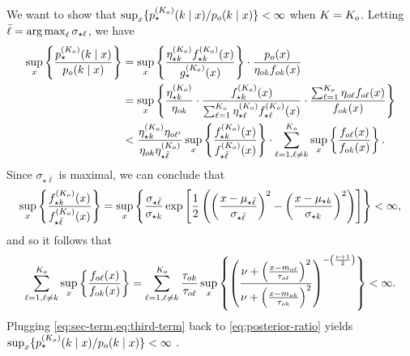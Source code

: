    We want to show that $\sup_x\{ p_{\star}^{(K_{o})}(k \mid x)/p_{o}(k \mid x) \}< \infty$ when $K = K_{o}$.
    Letting $\bar{\ell} = \argmax_\ell \sigma_{\star \ell}$, we have
	\begin{align}
		\sup_{x}\left\{\frac{p_{\star}^{(\numcomps_{o})}(k \mid x)}{p_{o}(k \mid x)}\right\}
		 & = \sup_{x}\left\{\frac{\eta^{(\numcomps_o)}_{\star k}f^{(\numcomps_o)}_{\star k}(x)}{g^{(\numcomps_o)}_{\star}(x)}\right\}\cdot \frac{p_{o}(x)}{\eta_{ok}f_{ok}(x)}    \\
		 & = \sup_{x}\left\{\frac{\eta^{(\numcomps_o)}_{\star k}}{\eta_{ok}} \cdot  \frac{f^{(\numcomps_o)}_{\star k}(x)}{\sum_{\ell=1}^{\numcomps_{o}}\eta^{(\numcomps_o)}_{\star \ell}f^{(\numcomps_o)}_{\star \ell}(x)} \cdot \frac{\sum_{\ell=1}^{\numcomps_{o}}\eta_{o\ell}f_{o\ell}(x)}{f_{ok}(x)}\right\} \\
         & < \frac{\eta^{(\numcomps_o)}_{\star k}\eta_{o\ell'}}{\eta_{ok}\eta^{(\numcomps_o)}_{\star \bar{\ell}}} \sup_{x} \left\{  \frac{f^{(\numcomps_o)}_{\star k}(x)}{f^{(\numcomps_o)}_{\star \bar{\ell}}(x)}\right\} \cdot  \sum_{\ell=1, \ell\ne k}^{\numcomps_o}\sup_{x}\left\{\frac{f_{o\ell}(x)}{f_{ok}(x)}\right\}. \label{eq:posterior-ratio}
	\end{align}
    Since $\sigma_{\star \bar{\ell}}$ is maximal, we can conclude that 
\begin{align}
\sup_{x} \left\{  \frac{f^{(\numcomps_o)}_{\star k}(x)}{f^{(\numcomps_o)}_{\star \bar{\ell}}(x)}\right\} = \sup_{x} \left\{ \frac{\sigma_{\star \bar{\ell}
}}{\sigma_{\star k}}\exp\left[\frac{1}{2} \left(\left(\frac{x-\mu_{\star \bar{\ell}}}{\sigma_{\star \bar{\ell}}}\right)^2 -\left(\frac{x-\mu_{\star k}}{\sigma_{\star k}}\right)^2 \right)\right] \right\} < \infty, \label{eq:sec-term}
\end{align}
and so it follows that 
\begin{align}
    \sum_{\ell=1, \ell\ne k}^{\numcomps_o}\sup_{x}\left\{\frac{f_{o\ell}(x)}{f_{ok}(x)}\right\} =  \sum_{\ell=1, \ell\ne k}^{\numcomps_o}\frac{\tau_{ok}}{\tau_{o\ell}} \sup_x \left\{ \left(\frac{\nu+\left(\frac{x-m_{o\ell}}{\tau_{o\ell}}\right)^2}{\nu+\left(\frac{x-m_{ok}}{\tau_{ok}}\right)^2}\right)^{-\left(\frac{\nu+1}{2}\right)} \right\} < \infty. \label{eq:third-term}
\end{align}
Plugging \cref{eq:sec-term,eq:third-term} back to \cref{eq:posterior-ratio} yields $\sup_x\{ p_{\star}^{(K_{o})}(k \mid x)/p_{o}(k \mid x) \}< \infty$ .


